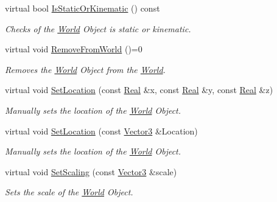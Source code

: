 \begin{DoxyCompactItemize}
virtual bool \hyperlink{classMezzanine_1_1WorldObject_ab5ebc61c589f90c990a9b4df29fd35f6}{IsStaticOrKinematic} () const 
\begin{DoxyCompactList}\small\item\em Checks of the \hyperlink{classMezzanine_1_1World}{World} Object is static or kinematic. \item\end{DoxyCompactList}\item 
\hypertarget{classMezzanine_1_1WorldObject_a67e3c05d50cc1ff631beecd37d87255a}{
virtual void \hyperlink{classMezzanine_1_1WorldObject_a67e3c05d50cc1ff631beecd37d87255a}{RemoveFromWorld} ()=0}
\label{classMezzanine_1_1WorldObject_a67e3c05d50cc1ff631beecd37d87255a}

\begin{DoxyCompactList}\small\item\em Removes the \hyperlink{classMezzanine_1_1World}{World} Object from the \hyperlink{classMezzanine_1_1World}{World}. \item\end{DoxyCompactList}\item 
virtual void \hyperlink{classMezzanine_1_1WorldObject_a453c9b26ba93d0640d95013944173fc4}{SetLocation} (const \hyperlink{namespaceMezzanine_a726731b1a7df72bf3583e4a97282c6f6}{Real} \&x, const \hyperlink{namespaceMezzanine_a726731b1a7df72bf3583e4a97282c6f6}{Real} \&y, const \hyperlink{namespaceMezzanine_a726731b1a7df72bf3583e4a97282c6f6}{Real} \&z)
\begin{DoxyCompactList}\small\item\em Manually sets the location of the \hyperlink{classMezzanine_1_1World}{World} Object. \item\end{DoxyCompactList}\item 
virtual void \hyperlink{classMezzanine_1_1WorldObject_a461ab18e5d01e09b15f14aa3fc8964c8}{SetLocation} (const \hyperlink{classMezzanine_1_1Vector3}{Vector3} \&Location)
\begin{DoxyCompactList}\small\item\em Manually sets the location of the \hyperlink{classMezzanine_1_1World}{World} Object. \item\end{DoxyCompactList}\item 
virtual void \hyperlink{classMezzanine_1_1WorldObject_a9a42a794a499e6c51c81e36ff18c3823}{SetScaling} (const \hyperlink{classMezzanine_1_1Vector3}{Vector3} \&scale)
\begin{DoxyCompactList}\small\item\em Sets the scale of the \hyperlink{classMezzanine_1_1World}{World} Object. \item\end{DoxyCompactList}\item 

\end{DoxyCompactItemize}
